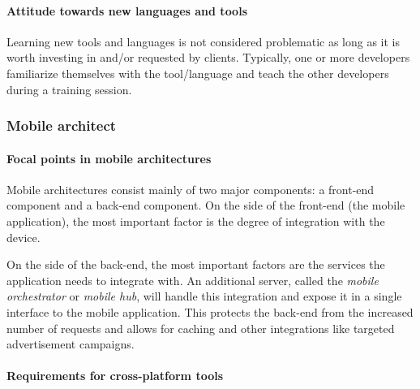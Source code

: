 \paragraph{Attitude towards new languages and tools} 

Learning new tools and languages is not considered problematic as long as it is worth investing in and/or requested by clients. Typically, one or more developers familiarize themselves with the tool/language and teach the other developers during a training session.

\subsubsection{Mobile architect}

\paragraph{Focal points in mobile architectures} 

Mobile architectures consist mainly of two major components: a front-end component and a back-end component. On the side of the front-end (the mobile application), the most important factor is the degree of integration with the device.

On the side of the back-end, the most important factors are the services the application needs to integrate with. An additional server, called the \emph{mobile orchestrator} or \emph{mobile hub}, will handle this integration and expose it in a single interface to the mobile application. This protects the back-end from the increased number of requests and allows for caching and other integrations like targeted advertisement campaigns.

\paragraph{Requirements for cross-platform tools}

